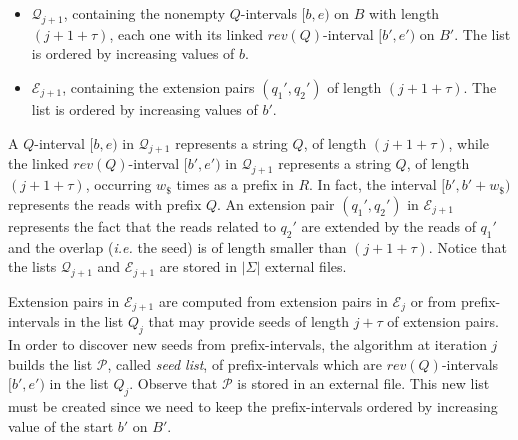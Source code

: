 \documentclass[runningheads,envcountsame,a4paper]{llncs}
\newcommand{\notaestesa}[2]{%
 \marginpar{\color{red!75!black}\textbf{\texttimes}}%
 {\color{red!75!black}%
 [\,\textbullet\,\textsf{\textbf{#1:}} %
 \textsf{\footnotesize#2}\,\textbullet\,]}%
}
\newcommand{\ie}{\textit{i.e.}\xspace}
\begin{document}
\begin{itemize}
\item $\mathcal{Q}_{j+1}$, containing the nonempty $Q$-intervals $[b, e)$ on $B$ with length $(j+ 1 + \tau)$,
each one with its linked
  $rev(Q)$-interval $[b', e')$ on $B'$. The list is  ordered by increasing values of $b$.
\item $\mathcal{E}_{j +1}$, containing the extension pairs $(q_{1}', q_{2}')$ of
  length $(j+1 +\tau)$.  The list is ordered by increasing values of $b'$.

\end{itemize}

A $Q$-interval  $[b,e)$ in $\mathcal{Q}_{j+1}$ represents a
string $Q$, of length $(j+1 +\tau)$, while
the linked $rev(Q)$-interval  $[b',e')$ in $\mathcal{Q}_{j+1}$  represents a
string $Q$, of length $(j+1+ \tau)$, occurring $w_\$$ times as a prefix in $R$.
In fact,   the interval $[b',b'+w_\$)$ represents the reads with prefix $Q$.
An extension pair $(q_{1}', q_{2}')$ in $\mathcal{E}_{j+1}$ represents the fact
that the reads related to $q_{2}'$ are extended by the reads of $q_{1}'$ and the
overlap (\ie the seed) is of length smaller than $(j+1+\tau)$.
Notice that the lists $\mathcal{Q}_{j+1}$ and  $\mathcal{E}_{j+1}$ are stored in $|\Sigma|$ external files.

Extension pairs in $\mathcal{E}_{j+1}$ are computed from extension pairs
in  $\mathcal{E}_{j}$ or from prefix-intervals in the list $Q_j$ that may
provide seeds of length $j + \tau$ of extension pairs.
In order to discover new seeds from prefix-intervals, the algorithm at iteration
$j$  builds the list $\mathcal{P}$, called {\em seed list},  of prefix-intervals  which are $rev(Q)$-intervals $[b', e')$ in the list $Q_j$. Observe that  $\mathcal{P}$   is  stored in an external file.
This new list must be created since we need to keep the prefix-intervals ordered by
increasing value of the start $b'$ on $B'$.



\end{document}
